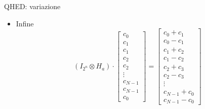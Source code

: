 \begin{frame}[allowframebreaks]{QHED: variazione}
\begin{itemize}
		\item Infine
		\[
		(I_{2^n} \otimes H_a) \cdot \begin{bmatrix}
			c_0\\c_1\\c_1\\c_2\\c_2\\\vdots\\c_{N-1}\\c_{N-1}\\c_0
		\end{bmatrix} = \begin{bmatrix}
			c_0+c_1\\c_0-c_1\\c_1+c_2\\c_1-c_2\\c_2+c_3\\c_2-c_3\\\vdots\\c_{N-1}+c_0\\c_{N-1}-c_0
		\end{bmatrix}
		\]
	\end{itemize}
\end{frame}
